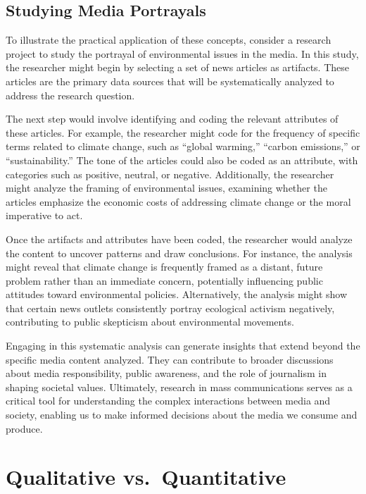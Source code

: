\documentclass[
]{book}
\begin{document}
\subsection*{Studying Media Portrayals}\label{studying-media-portrayals}

To illustrate the practical application of these concepts, consider a research project to study the portrayal of environmental issues in the media. In this study, the researcher might begin by selecting a set of news articles as artifacts. These articles are the primary data sources that will be systematically analyzed to address the research question.

The next step would involve identifying and coding the relevant attributes of these articles. For example, the researcher might code for the frequency of specific terms related to climate change, such as ``global warming,'' ``carbon emissions,'' or ``sustainability.'' The tone of the articles could also be coded as an attribute, with categories such as positive, neutral, or negative. Additionally, the researcher might analyze the framing of environmental issues, examining whether the articles emphasize the economic costs of addressing climate change or the moral imperative to act.

Once the artifacts and attributes have been coded, the researcher would analyze the content to uncover patterns and draw conclusions. For instance, the analysis might reveal that climate change is frequently framed as a distant, future problem rather than an immediate concern, potentially influencing public attitudes toward environmental policies. Alternatively, the analysis might show that certain news outlets consistently portray ecological activism negatively, contributing to public skepticism about environmental movements.

Engaging in this systematic analysis can generate insights that extend beyond the specific media content analyzed. They can contribute to broader discussions about media responsibility, public awareness, and the role of journalism in shaping societal values. Ultimately, research in mass communications serves as a critical tool for understanding the complex interactions between media and society, enabling us to make informed decisions about the media we consume and produce.

\section{Qualitative vs.~Quantitative}\label{qualitative-vs.-quantitative}
\end{document}
